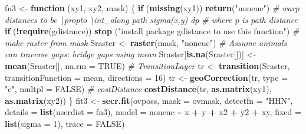\documentclass[
]{book}
\newenvironment{Shaded}{\begin{snugshade}}{\end{snugshade}}
\newcommand{\AttributeTok}[1]{\textcolor[rgb]{0.13,0.29,0.53}{#1}}
\newcommand{\CommentTok}[1]{\textcolor[rgb]{0.56,0.35,0.01}{\textit{#1}}}
\newcommand{\ConstantTok}[1]{\textcolor[rgb]{0.56,0.35,0.01}{#1}}
\newcommand{\ControlFlowTok}[1]{\textcolor[rgb]{0.13,0.29,0.53}{\textbf{#1}}}
\newcommand{\DecValTok}[1]{\textcolor[rgb]{0.00,0.00,0.81}{#1}}
\newcommand{\FunctionTok}[1]{\textcolor[rgb]{0.13,0.29,0.53}{\textbf{#1}}}
\newcommand{\NormalTok}[1]{#1}
\newcommand{\OtherTok}[1]{\textcolor[rgb]{0.56,0.35,0.01}{#1}}
\newcommand{\SpecialCharTok}[1]{\textcolor[rgb]{0.81,0.36,0.00}{\textbf{#1}}}
\newcommand{\StringTok}[1]{\textcolor[rgb]{0.31,0.60,0.02}{#1}}
\begin{document}
\begin{Shaded}
\begin{Highlighting}[]
\NormalTok{fn3 }\OtherTok{\textless{}{-}} \ControlFlowTok{function}\NormalTok{ (xy1, xy2, mask) \{}
  \ControlFlowTok{if}\NormalTok{ (}\FunctionTok{missing}\NormalTok{(xy1)) }\FunctionTok{return}\NormalTok{(}\StringTok{"noneuc"}\NormalTok{)}
  \CommentTok{\# warp distances to be \textbackslash{}propto \textbackslash{}int\_along path sigma(x,y) dp}
  \CommentTok{\# where p is path distance  }
  \ControlFlowTok{if}\NormalTok{ (}\SpecialCharTok{!}\FunctionTok{require}\NormalTok{(gdistance))}
    \FunctionTok{stop}\NormalTok{ (}\StringTok{"install package gdistance to use this function"}\NormalTok{)}
  \CommentTok{\# make raster from mask}
\NormalTok{  Sraster }\OtherTok{\textless{}{-}} \FunctionTok{raster}\NormalTok{(mask, }\StringTok{"noneuc"}\NormalTok{)}
  \CommentTok{\# Assume animals can traverse gaps: bridge gaps using mean}
\NormalTok{  Sraster[}\FunctionTok{is.na}\NormalTok{(Sraster[])] }\OtherTok{\textless{}{-}} \FunctionTok{mean}\NormalTok{(Sraster[], }\AttributeTok{na.rm =} \ConstantTok{TRUE}\NormalTok{)}
  \CommentTok{\# TransitionLayer}
\NormalTok{  tr }\OtherTok{\textless{}{-}} \FunctionTok{transition}\NormalTok{(Sraster, }\AttributeTok{transitionFunction =}\NormalTok{ mean, }
                   \AttributeTok{directions =} \DecValTok{16}\NormalTok{)}
\NormalTok{  tr }\OtherTok{\textless{}{-}} \FunctionTok{geoCorrection}\NormalTok{(tr, }\AttributeTok{type =} \StringTok{"c"}\NormalTok{, }\AttributeTok{multpl =} \ConstantTok{FALSE}\NormalTok{)}
  \CommentTok{\# costDistance}
  \FunctionTok{costDistance}\NormalTok{(tr, }\FunctionTok{as.matrix}\NormalTok{(xy1), }\FunctionTok{as.matrix}\NormalTok{(xy2))}
\NormalTok{\}}
\NormalTok{fit3 }\OtherTok{\textless{}{-}} \FunctionTok{secr.fit}\NormalTok{(ovposs, }\AttributeTok{mask =}\NormalTok{ ovmask, }\AttributeTok{detectfn =} \StringTok{"HHN"}\NormalTok{,}
    \AttributeTok{details =} \FunctionTok{list}\NormalTok{(}\AttributeTok{userdist =}\NormalTok{ fn3), }\AttributeTok{model =}\NormalTok{ noneuc }\SpecialCharTok{\textasciitilde{}}\NormalTok{ x }\SpecialCharTok{+}\NormalTok{ y }\SpecialCharTok{+} 
\NormalTok{     x2 }\SpecialCharTok{+}\NormalTok{ y2 }\SpecialCharTok{+}\NormalTok{ xy, }\AttributeTok{fixed =} \FunctionTok{list}\NormalTok{(}\AttributeTok{sigma =} \DecValTok{1}\NormalTok{), }\AttributeTok{trace =} \ConstantTok{FALSE}\NormalTok{)}
\end{Highlighting}
\end{Shaded}
\end{document}
